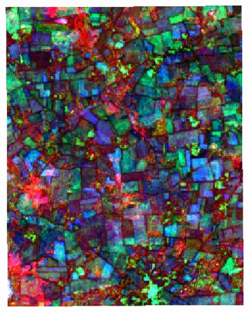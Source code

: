 \documentclass[journal,article,submit,pdftex,moreauthors]{Definitions/mdpi}
\providecommand{\DIFaddbeginFL}{} %
\providecommand{\DIFaddendFL}{} %
\providecommand{\DIFdelbeginFL}{} %
\providecommand{\DIFdelendFL}{} %
\begin{document}
\begin{figure}[H]
\begin{subfigure}[t]{0.23\linewidth}
\DIFdelendFL \DIFaddbeginFL \includegraphics[width=0.95\linewidth]{figures/aes_1_layer_mse_results/composites/composite_image_456657.pdf}
    \DIFaddendFL \caption{}
	\label{fig:color_map_e}
	\end{subfigure}
    \begin{subfigure}[t]{0.23\linewidth}
		\centering
	\DIFdelbeginFL %

\end{subfigure}
\end{figure}
\end{document}
